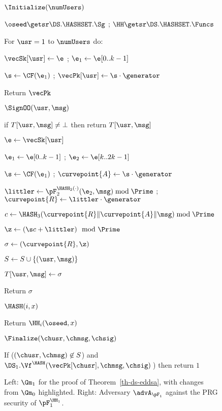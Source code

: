 \begin{figure}
{	\begin{oracle}{$\Initialize(\numUsers)$}
		\item $\oseed\getsr\DS.\HASHSET.\Sg$ ; 
		$\HH \getsr \DS.\HASHSET.\Funcs$
		\item For $\usr=1$ to $\numUsers$ do:
		\item \quad \gamechange{$\e\gets \FnO(\usr)$} 
		\item \quad $\vecSk[\usr] \gets \e$
		; $\e_1 \gets \e[0..k-1]$ 
		\item \quad $\s \gets \CF(\e_1)$ ; $\vecPk[\usr] \gets \s\cdot \generator$
		\item Return $\vecPk$
	\end{oracle}
	\ExptSepSpace
	
	\begin{oracle}{$\SignOO(\usr, \msg)$}
		\item if $T[\usr, \msg] \neq \bot$ then return $T[\usr, \msg]$
		\item $\e \gets \vecSk[\usr]$
		\item $\e_1 \gets \e[0..k-1]$ ; $\e_2 \gets \e[k..2k-1]$ 
		\item $\s \gets \CF(\e_1)$ ; $\curvepoint{A} \gets \s\cdot \generator$
		\item $\littler \gets \pF_2^{\HASH_2(\cdot)}(\e_2,\msg)\bmod \Prime$ 
		; $\curvepoint{R} \gets \littler\cdot \generator$
		\item $c \gets \HASH_3(\curvepoint{R}\|\curvepoint{A}\|\msg) \bmod \Prime$
		\item $\z \gets (\s c + \littler) \mod \Prime$
		\item $\sigma \gets (\curvepoint{R},\z)$
		\item $S \gets S \cup \{(\usr, \msg)\}$
		\item $T[\usr, \msg] \gets \sigma$
		\item Return $\sigma$
	\end{oracle}
	\ExptSepSpace
	
	\begin{oracle}{$\HASH(i,x)$}
		\item Return $\HH_i(\oseed,x)$
	\end{oracle}
	\ExptSepSpace
	
	\begin{oracle}{$\Finalize(\chusr, \chmsg, \chsig)$}
		\item If ($(\chusr,\chmsg) \not\in S$) and $\DS_1.\Vf^{\HASH}(\vecPk[\chusr], \chmsg, \chsig)\:$) then return $1$ \vspace{2pt}
	\end{oracle}
}
	\vspace{-5pt}
	\caption{Left: $\Gm_1$ for the proof of Theorem~\ref{th-ds-eddsa}, with changes from $\Gm_0$ highlighted. Right: Adversary $\advA_{\pF_1}$ against the PRG security of $\pF_1^{\HH_1}$.}
	\label{fig:gm1}
	\hrulefill
	\vspace{-10pt}
\end{figure}



